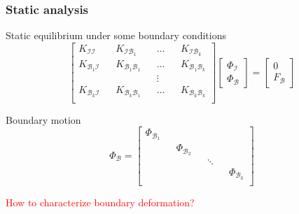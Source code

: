 \documentclass[serif,mathserif, 12pt]{beamer}
\newcommand{\TODO}[1]{\textcolor{red}{#1}}
\begin{document}
\begin{frame}
  \frametitle{Static analysis}
  \begin{itemize}
     {
  \item Static equilibrium under some boundary conditions
    \begin{equation*}
      \begin{bmatrix}
        K_{\mathcal{II}} && K_{\mathcal{IB}_1} && \dots && K_{\mathcal{IB}_k} \\
        K_{\mathcal{B}_1\mathcal{I}} && K_{\mathcal{B}_1\mathcal{B}_1} && \dots && K_{\mathcal{B}_1\mathcal{B}_k} \\
        & &  & &\vdots & \\
        K_{\mathcal{B}_k\mathcal{I}} && K_{\mathcal{B}_k\mathcal{B}_1} && \dots && K_{\mathcal{B}_k\mathcal{B}_k} \\
      \end{bmatrix}
      \begin{bmatrix}
        \Phi_{\mathcal{I}} \\
        \Phi_{\mathcal{B}}
      \end{bmatrix}
      =
      \begin{bmatrix}
        0 \\
        F_{\mathcal{B}}
      \end{bmatrix}
    \end{equation*}
    }
     {
  \item Boundary motion
    \begin{equation*}
      \Phi_{\mathcal{B}} =
      \begin{bmatrix}
        \Phi_{\mathcal{B}_1} && && && \\
        && \Phi_{\mathcal{B}_2}  && && \\
        &&  && \ddots && \\
        &&  &&   && \Phi_{\mathcal{B}_k}  \\
      \end{bmatrix}
    \end{equation*}
    } 
  \item {} {\TODO{How to characterize boundary deformation?}}
  \end{itemize}
\end{frame}
\end{document}
